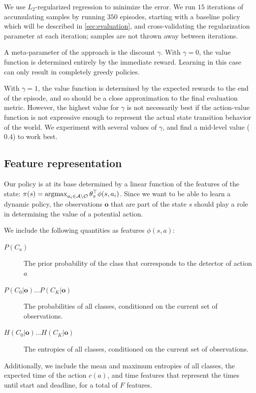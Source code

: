 We use $L_2$-regularized regression to minimize the error.
We run $15$ iterations of accumulating samples by running $350$ episodes, starting with a baseline policy which will be described in \autoref{sec:evaluation}, and cross-validating the regularization parameter at each iteration; samples are not thrown away between iterations.

A meta-parameter of the approach is the discount $\gamma$.
With $\gamma=0$, the value function is determined entirely by the immediate reward.
Learning in this case can only result in completely greedy policies.

With $\gamma=1$, the value function is determined by the expected rewards to the end of the episode, and so should be a close approximation to the final evaluation metric.
However, the highest value for $\gamma$ is not necessarily best if the action-value function is not expressive enough to represent the actual state transition behavior of the world.
We experiment with several values of $\gamma$, and find a mid-level value ($0.4$) to work best.

\subsection{Feature representation}
Our policy is at its base determined by a linear function of the features of the state: $\pi(s) = \argmax_{a_i \in \mathcal{A} \setminus \mathcal{O}} \theta_\pi^\top \phi(s,a_i)$.
Since we want to be able to learn a dynamic policy, the observations $\mathbf{o}$ that are part of the state $s$ should play a role in determining the value of a potential action.

We include the following quantities as features $\phi(s,a)$:
\begin{description}
\item[$P(C_a)$] The prior probability of the class that corresponds to the detector of action $a$
\item[$P(C_0|\mathbf{o}) \ldots P(C_K|\mathbf{o})$] The probabilities of all classes, conditioned on the current set of observations.
\item[$H(C_0|\mathbf{o}) \ldots H(C_K|\mathbf{o})$] The entropies of all classes, conditioned on the current set of observations.
\end{description}

Additionally, we include the mean and maximum entropies of all classes, the expected time of the action $c(a)$, and time features that represent the times until start and deadline, for a total of $F$ features.


